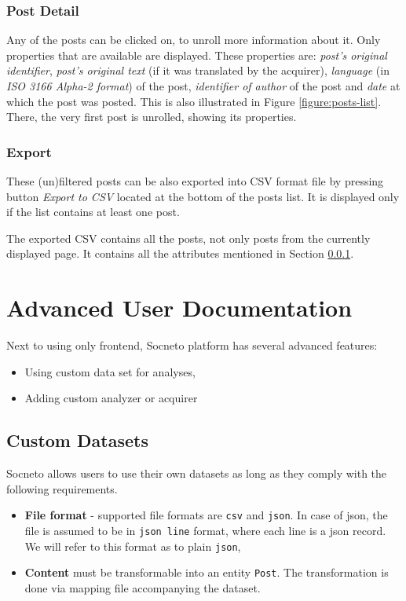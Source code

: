 \documentclass{article}
\begin{document}
\subsubsection{Post Detail}\label{section:post-detail}
Any of the posts can be clicked on, to unroll more information about it. Only properties that are available are displayed. These properties are: \textit{post's original identifier}, \textit{post's original text} (if it was translated by the acquirer), \textit{language} (in \textit{ISO 3166 Alpha-2 format}) of the post, \textit{identifier of author} of the post and \textit{date} at which the post was posted. This is also illustrated in Figure \ref{figure:posts-list}. There, the very first post is unrolled, showing its properties.

\subsubsection{Export}
These (un)filtered posts can be also exported into CSV format file by pressing button \textit{Export to CSV} located at the bottom of the posts list. It is displayed only if the list contains at least one post. 

The exported CSV contains all the posts, not only posts from the currently displayed page. It contains all the attributes mentioned in Section \ref{section:post-detail}.


\section{Advanced User Documentation}
Next to using only frontend, Socneto platform has several advanced features:
\begin{itemize}
    \item Using custom data set for analyses,
    \item Adding custom analyzer or acquirer
\end{itemize}

\subsection{Custom Datasets}\label{section:custom-datasets}
Socneto allows users to use their own datasets as long as they comply with the following requirements.

\begin{itemize}
    \item \textbf{File format} - supported file formats are \texttt{csv} and \texttt{json}. In case of json, the file is assumed to be in \texttt{json line} format, where each line is a json record. We will refer to this format as to plain \texttt{json},
    \item \textbf{Content} must be transformable into an entity \texttt{Post}. The transformation is done via mapping file accompanying the dataset.
\end{itemize}
\end{document}
